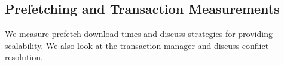 




\subsection{Prefetching and Transaction Measurements}
We measure prefetch download times and discuss strategies for providing scalability.  We also
look at the transaction manager and discuss conflict resolution.

